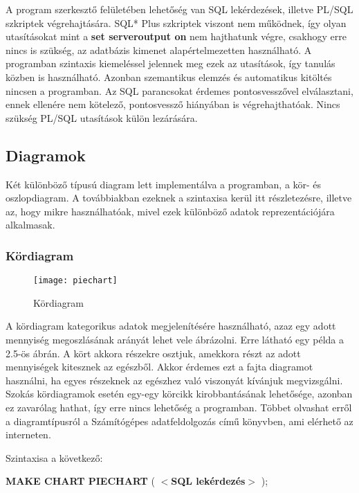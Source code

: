 A program szerkesztő felületében lehetőség van SQL lekérdezések, illetve PL/SQL szkriptek végrehajtására. SQL* Plus szkriptek viszont
nem működnek, így olyan utasításokat mint a \textbf{set serveroutput on} nem hajthatunk végre, csakhogy erre nincs is szükség, az adatbázis kimenet alapértelmezetten
használható. A programban szintaxis kiemeléssel jelennek meg ezek az utasítások, így tanulás közben is használható. Azonban szemantikus elemzés és automatikus
kitöltés nincsen a programban. Az SQL parancsokat érdemes pontosvesszővel elválasztani, ennek ellenére nem kötelező, pontosvessző hiányában is végrehajthatóak.
Nincs szükség PL/SQL utasítások külön lezárására.

\subsection{Diagramok}
Két különböző típusú diagram lett implementálva a programban, a kör- és oszlopdiagram. A továbbiakban
ezeknek a szintaxisa kerül itt részletezésre, illetve az, hogy mikre használhatóak, mivel ezek különböző adatok
reprezentációjára alkalmasak.

\subsubsection{Kördiagram}
\begin{figure}[ht]
  \begin{center}
    \texttt{[image: piechart]}
  \end{center}
 \caption{Kördiagram}
\end{figure}

A kördiagram kategorikus adatok megjelenítésére használható, azaz egy adott mennyiség megoszlásának arányát lehet vele
ábrázolni. Erre látható egy példa a 2.5-ös ábrán. A kört akkora részekre osztjuk, amekkora részt az adott mennyiségek kitesznek az egészből. Akkor érdemes ezt
a fajta diagramot használni, ha egyes részeknek az egészhez való viszonyát kívánjuk megvizsgálni. Szokás kördiagramok esetén egy-egy
körcikk kirobbantásának lehetősége, azonban ez zavarólag hathat, így erre nincs lehetőség a programban. Többet olvashat erről a diagramtípusról a
Számítógépes adatfeldolgozás\cite{szamadat} című könyvben, ami elérhető az interneten.

Szintaxisa a következő:

\textbf{{\color{awesomeblue} MAKE CHART PIECHART }} ( \textbf{$<$SQL lekérdezés$>$} );

